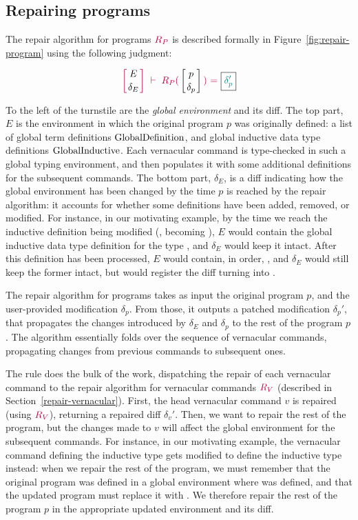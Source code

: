 \subsection{Repairing programs} \label{repair-program}

The repair algorithm for programs $\textcolor{purple}{R_{P}}$ is described formally in
Figure~\ref{fig:repair-program} using the following judgment:

{
  \[
    {\turnstile
      {\denv{E}{\delta_E}}
      {\repairProg{p}{\delta_p}{\delta_p'}}
    }
  \]
}

\noindent To the left of the turnstile are the \textit{global environment} and
its diff.  The top part, $E$ is the environment in which the original program
$p$ was originally defined: a list of global term definitions
$\text{GlobalDefinition}$, and global inductive data type definitions
$\text{GlobalInductive}$.  Each vernacular command is type-checked in such a
global typing environment, and then populates it with some additional
definitions for the subsequent commands.  The bottom part, $\delta_E$, is a diff
indicating how the global environment has been changed by the time $p$ is
reached by the repair algorithm: it accounts for whether some definitions have
been added, removed, or modified.  For instance, in our motivating example, by
the time we reach the inductive definition being modified (,
becoming ), $E$ would contain the global inductive data type
definition for the type , and $\delta_E$ would keep it intact.
After this definition has been processed, $E$ would contain, in order,
 , and $\delta_E$ would still keep the former
intact, but would register the diff turning  into
.

The repair algorithm for programs takes as input the original program $p$, and
the user-provided modification $\delta_p$.  From those, it outputs a patched
modification $\delta_p'$, that propagates the changes introduced by $\delta_E$
and $\delta_p$ to the rest of the program $p$.  The algorithm essentially folds
over the sequence of vernacular commands, propagating changes from previous
commands to subsequent ones.

The rule  does the bulk of the work, dispatching the repair
of each vernacular command to the repair algorithm for vernacular commands
$\textcolor{purple}{R_{V}}$ (described in Section~\ref{repair-vernacular}).  First, the
head vernacular command $v$ is repaired (using $\textcolor{purple}{R_{V}}$), returning a
repaired diff $\delta_v'$.  Then, we want to repair the rest of the program, but
the changes made to $v$ will affect the global environment for the subsequent
commands.  For instance, in our motivating example, the vernacular command
defining the inductive type  gets modified to define the
inductive type  instead: when we repair the rest of the program,
we must remember that the original program was defined in a global environment
where  was defined, and that the updated program must replace it
with .  We therefore repair the rest of the program $p$ in the
appropriate updated environment and its diff.

